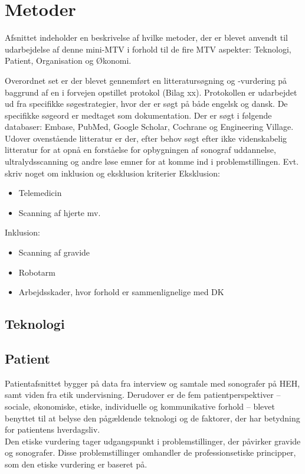 \chapter{Metoder}
Afsnittet indeholder en beskrivelse af hvilke metoder, der er blevet anvendt til udarbejdelse af denne mini-MTV i forhold til de fire MTV aspekter: Teknologi, Patient, Organisation og Økonomi.

Overordnet set er der blevet gennemført en litteratursøgning og -vurdering på baggrund af en i forvejen opstillet protokol (Bilag xx). Protokollen er udarbejdet ud fra specifikke søgestrategier, hvor der er søgt på både engelsk og dansk. De specifikke søgeord er medtaget som dokumentation. Der er søgt i følgende databaser: Embase, PubMed, Google Scholar, Cochrane og Engineering Village. \\
Udover ovenstående litteratur er der, efter behov søgt efter ikke videnskabelig litteratur for at opnå en forståelse for opbygningen af sonograf uddannelse, ultralydsscanning og andre løse emner for at komme ind i problemstillingen. 
Evt. skriv noget om inklusion og eksklusion kriterier
Eksklusion:
\begin{itemize}
\item Telemedicin
\item Scanning af hjerte mv.
\end{itemize}
Inklusion:
\begin{itemize}
\item Scanning af gravide
\item Robotarm
\item Arbejdsskader, hvor forhold er sammenlignelige med DK
\end{itemize}

\section{Teknologi}
\section{Patient}
Patientafsnittet bygger på data fra interview og samtale med sonografer på HEH, samt viden fra etik undervisning. Derudover er de fem patientperspektiver – sociale, økonomiske, etiske, individuelle og kommunikative forhold – blevet benyttet til at belyse den pågældende teknologi og de faktorer, der har betydning for patientens hverdagsliv.\\ 
Den etiske vurdering tager udgangspunkt i problemstillinger, der påvirker gravide og sonografer. Disse problemstillinger omhandler de professionsetiske principper, som den etiske vurdering er baseret på.
